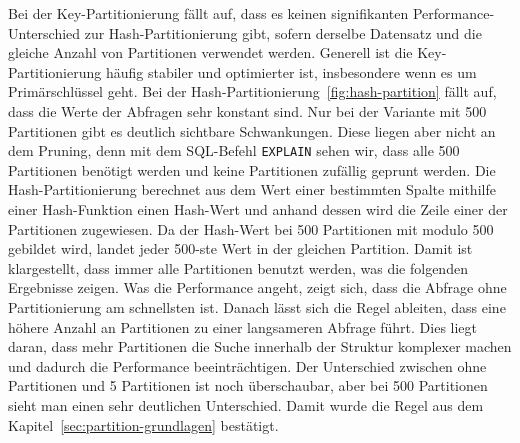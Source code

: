 Bei der Key-Partitionierung fällt auf, dass es keinen signifikanten Performance-Unterschied zur Hash-Partitionierung gibt, sofern derselbe Datensatz und die gleiche Anzahl von Partitionen verwendet werden.
Generell ist die Key-Partitionierung häufig stabiler und optimierter ist, insbesondere wenn es um Primärschlüssel geht.
Bei der Hash-Partitionierung~\ref{fig:hash-partition} fällt auf, dass die Werte der Abfragen sehr konstant sind.
Nur bei der Variante mit 500 Partitionen gibt es deutlich sichtbare Schwankungen.
Diese liegen aber nicht an dem Pruning, denn mit dem SQL-Befehl \texttt{EXPLAIN} sehen wir, dass alle 500 Partitionen benötigt werden und keine Partitionen zufällig geprunt werden.
Die Hash-Partitionierung berechnet aus dem Wert einer bestimmten Spalte mithilfe einer Hash-Funktion einen Hash-Wert und anhand dessen wird die Zeile einer der Partitionen zugewiesen.
Da der Hash-Wert bei 500 Partitionen mit modulo 500 gebildet wird, landet jeder 500-ste Wert in der gleichen Partition.
Damit ist klargestellt, dass immer alle Partitionen benutzt werden, was die folgenden Ergebnisse zeigen.
Was die Performance angeht, zeigt sich, dass die Abfrage ohne Partitionierung am schnellsten ist.
Danach lässt sich die Regel ableiten, dass eine höhere Anzahl an Partitionen zu einer langsameren Abfrage führt.
Dies liegt daran, dass mehr Partitionen die Suche innerhalb der Struktur komplexer machen und dadurch die Performance beeinträchtigen.
Der Unterschied zwischen ohne Partitionen und 5 Partitionen ist noch überschaubar, aber bei 500 Partitionen sieht man einen sehr deutlichen Unterschied.
Damit wurde die Regel aus dem Kapitel~\ref{sec:partition-grundlagen} bestätigt.

